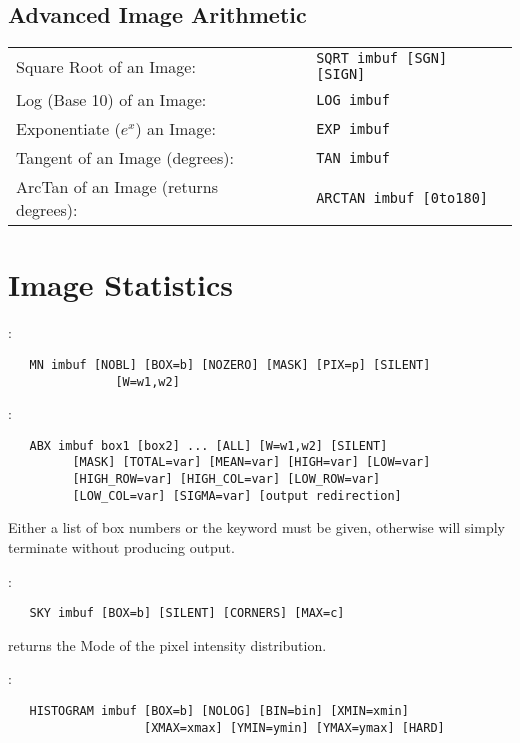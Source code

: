 \subsection{Advanced Image Arithmetic}

\begin{center}
   \begin{tabular}{lcl}
      Square Root of an Image:&&\verb+SQRT imbuf [SGN] [SIGN]+\\
      Log (Base 10) of an Image:&&\verb+LOG imbuf+\\
      Exponentiate ($e^x$) an Image:&&\verb+EXP imbuf+\\
      Tangent of an Image (degrees):&&\verb+TAN imbuf+\\
      ArcTan of an Image (returns degrees):&&\verb+ARCTAN imbuf [0to180]+\\
   \end{tabular}
\end{center}


\section{Image Statistics}

:
\begin{verbatim}
   MN imbuf [NOBL] [BOX=b] [NOZERO] [MASK] [PIX=p] [SILENT]
               [W=w1,w2]
\end{verbatim}

\noindent {}:
\begin{verbatim}
   ABX imbuf box1 [box2] ... [ALL] [W=w1,w2] [SILENT]
         [MASK] [TOTAL=var] [MEAN=var] [HIGH=var] [LOW=var]
         [HIGH_ROW=var] [HIGH_COL=var] [LOW_ROW=var]
         [LOW_COL=var] [SIGMA=var] [output redirection]
\end{verbatim}

\noindent Either a list of box numbers or the keyword  must be
given, otherwise  will simply terminate without producing output.

\noindent {}:
\begin{verbatim}
   SKY imbuf [BOX=b] [SILENT] [CORNERS] [MAX=c]
\end{verbatim}
 returns the Mode of the pixel intensity distribution.

\noindent {}:
\begin{verbatim}
   HISTOGRAM imbuf [BOX=b] [NOLOG] [BIN=bin] [XMIN=xmin]
                   [XMAX=xmax] [YMIN=ymin] [YMAX=ymax] [HARD]
\end{verbatim}

